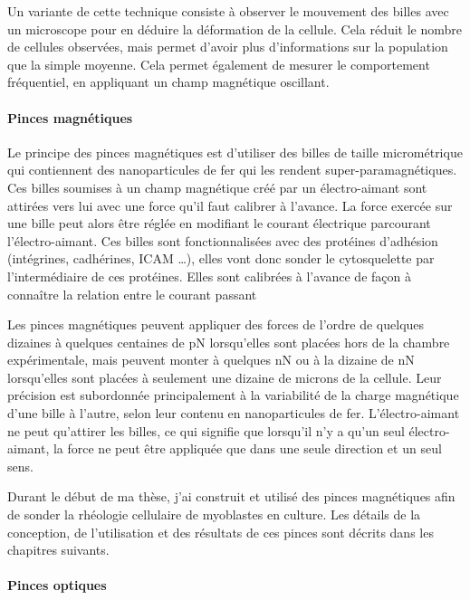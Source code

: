 \documentclass{report}
\begin{document}
Un variante de cette technique consiste à observer le mouvement des billes avec un microscope pour en déduire la déformation de la cellule. Cela réduit le nombre de cellules observées, mais permet d'avoir plus d'informations sur la population que la simple moyenne. Cela permet également de mesurer le comportement fréquentiel, en appliquant un champ magnétique oscillant. 






\paragraph{Pinces magnétiques}

Le principe des pinces magnétiques est d'utiliser des billes de taille micrométrique qui contiennent des nanoparticules de fer qui les rendent super-paramagnétiques.
Ces billes soumises à un champ magnétique créé par un électro-aimant sont attirées vers lui avec une force qu'il faut calibrer à l'avance.
La force exercée sur une bille peut alors être réglée en modifiant le courant électrique parcourant l'électro-aimant.
Ces billes sont fonctionnalisées avec des protéines d'adhésion (intégrines, cadhérines, ICAM \dots), elles vont donc sonder le cytosquelette par l'intermédiaire de ces protéines. 
Elles sont calibrées à l'avance de façon à connaître la relation entre le courant passant

Les pinces magnétiques peuvent appliquer des forces de l'ordre de quelques dizaines à quelques centaines de pN lorsqu'elles sont placées hors de la chambre expérimentale, mais peuvent monter à quelques nN ou à la dizaine de nN lorsqu'elles sont placées à seulement une dizaine de microns de la cellule. 
Leur précision est subordonnée principalement à la variabilité de la charge magnétique d'une bille à l'autre, selon leur contenu en nanoparticules de fer. 
L'électro-aimant ne peut qu'attirer les billes, ce qui signifie que lorsqu'il n'y a qu'un seul électro-aimant, la force ne peut être appliquée que dans une seule direction et un seul sens. 

Durant le début de ma thèse, j'ai construit et utilisé des pinces magnétiques afin de sonder la rhéologie cellulaire de myoblastes en culture. Les détails de la conception, de l'utilisation et des résultats de ces pinces sont décrits dans les chapitres suivants. 


\paragraph{Pinces optiques}
\end{document}
